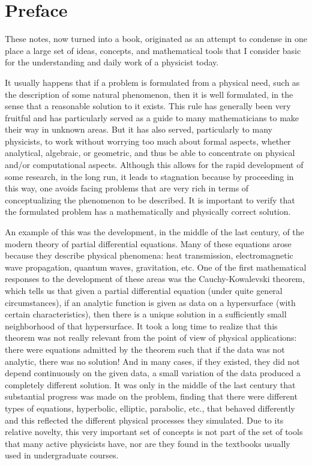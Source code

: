 \chapter*{Preface}

These notes, now turned into a book, originated as an attempt to condense in one place a large set of ideas, concepts, and mathematical tools that I consider basic for the understanding and daily work of a physicist today.

It usually happens that if a problem is formulated from a physical need, such as the description of some natural phenomenon, then it is well formulated, in the sense that a reasonable solution to it exists. This rule has generally been very fruitful and has particularly served as a guide to many mathematicians to make their way in unknown areas. But it has also served, particularly to many physicists, to work without worrying too much about formal aspects, whether analytical, algebraic, or geometric, and thus be able to concentrate on physical and/or computational aspects. Although this allows for the rapid development of some research, in the long run, it leads to stagnation because by proceeding in this way, one avoids facing problems that are very rich in terms of conceptualizing the phenomenon to be described. It is important to verify that the formulated problem has a mathematically and physically correct solution.

An example of this was the development, in the middle of the last century, of the modern theory of partial differential equations. Many of these equations arose because they describe physical phenomena: heat transmission, electromagnetic wave propagation, quantum waves, gravitation, etc. One of the first mathematical responses to the development of these areas was the Cauchy-Kowalevski theorem, which tells us that given a partial differential equation (under quite general circumstances), if an analytic function is given as data on a hypersurface (with certain characteristics), then there is a unique solution in a sufficiently small neighborhood of that hypersurface. It took a long time to realize that this theorem was not really relevant from the point of view of physical applications: there were equations admitted by the theorem such that if the data was not analytic, there was no solution! And in many cases, if they existed, they did not depend continuously on the given data, a small variation of the data produced a completely different solution. It was only in the middle of the last century that substantial progress was made on the problem, finding that there were different types of equations, hyperbolic, elliptic, parabolic, etc., that behaved differently and this reflected the different physical processes they simulated. Due to its relative novelty, this very important set of concepts is not part of the set of tools that many active physicists have, nor are they found in the textbooks usually used in undergraduate courses.

